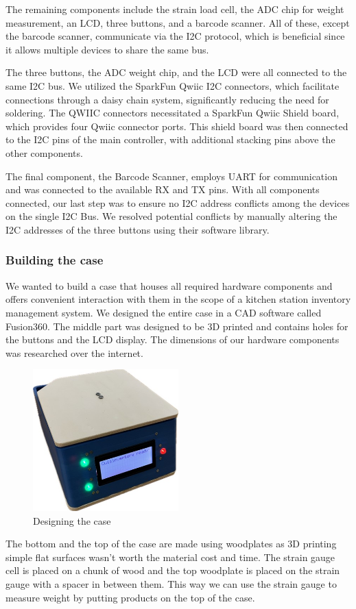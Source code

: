\documentclass{article}
\begin{document}
The remaining components include the strain load cell, the ADC chip for weight measurement, an LCD, three buttons, and a barcode scanner. All of these, except the barcode scanner, communicate via the I2C protocol, which is beneficial since it allows multiple devices to share the same bus.

The three buttons, the ADC weight chip, and the LCD were all connected to the same I2C bus. We utilized the SparkFun Qwiic I2C connectors, which facilitate connections through a daisy chain system, significantly reducing the need for soldering. The QWIIC connectors necessitated a SparkFun Qwiic Shield board, which provides four Qwiic connector ports. This shield board was then connected to the I2C pins of the main controller, with additional stacking pins above the other components.

The final component, the Barcode Scanner, employs UART for communication and was connected to the available RX and TX pins. With all components connected, our last step was to ensure no I2C address conflicts among the devices on the single I2C Bus. We resolved potential conflicts by manually altering the I2C addresses of the three buttons using their software library.

\subsubsection{Building the case}
We wanted to build a case that houses all required hardware components and offers convenient interaction with them in the scope of a kitchen station inventory management system.
We designed the entire case in a CAD software called Fusion360. The middle part was designed to be 3D printed and contains holes for the buttons and the LCD display.
The dimensions of our hardware components was researched over the internet.
\begin{figure}[h]
	\centering
	\includegraphics[width=0.5\textwidth]{case2.jpg}
	\caption{Designing the case}
	\label{fig:mesh1}
\end{figure}
The bottom and the top of the case are made using woodplates as 3D printing simple flat surfaces wasn't worth the material cost and time.
The strain gauge cell is placed on a chunk of wood and the top woodplate is placed on the strain gauge with a spacer in between them.
This way we can use the strain gauge to measure weight by putting products on the top of the case.
\end{document}
